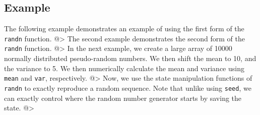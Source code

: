 \subsection{Example}

The following example demonstrates an example of using the first form of the \verb|randn| function.
@>
The second example demonstrates the second form of the \verb|randn| function.
@>
In the next example, we create a large array of 10000  normally distributed pseudo-random numbers.  We then shift the mean to 10, and the variance to 5.  We then numerically calculate the mean and variance using \verb|mean| and \verb|var|, respectively.
@>
Now, we use the state manipulation functions of \verb|randn| to exactly reproduce 
a random sequence.  Note that unlike using \verb|seed|, we can exactly control where
the random number generator starts by saving the state.
@>

